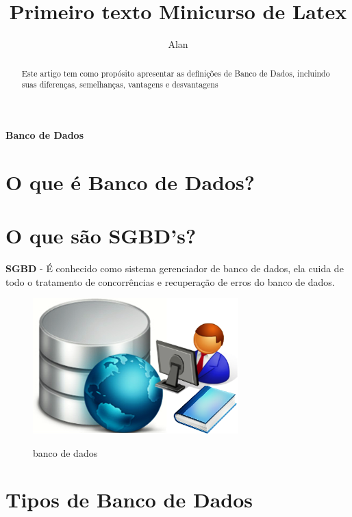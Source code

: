 \documentclass[12pt,a4paper,onecolumn]{article}
\author{Alan}
\title{Primeiro texto Minicurso de Latex}
\begin{document}
\tableofcontents
\newpage



\begin{center}
\textbf{\large Banco de Dados}\vspace{1.5cm}
\end{center}
\begin{abstract}
		Este artigo tem como propósito apresentar as definições de Banco de Dados, incluindo suas diferenças, semelhanças, vantagens e desvantagens
\end{abstract}

\section{O que é Banco de Dados?}

\section{O que são SGBD's?}

	\textbf{SGBD} - É conhecido como sistema gerenciador de banco de dados, ela cuida
	de todo o tratamento de concorrências e recuperação de erros do banco de dados.
	
\begin{figure}[!h]
	\centering
	\includegraphics{bd.png}
	\label{figura}
	\caption{banco de dados}
\end{figure}
	
\section{Tipos de Banco de Dados}	
\end{document}
